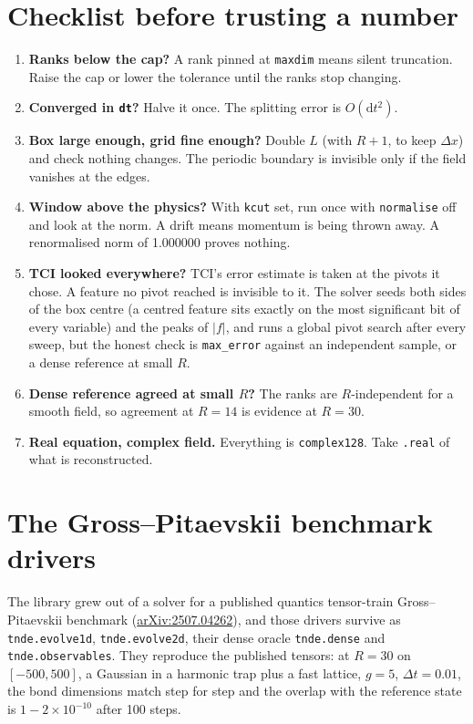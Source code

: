 \documentclass[11pt,a4paper]{article}
\newcommand{\code}[1]{\texttt{#1}}
\newcommand{\dd}{\mathrm{d}}
\begin{document}
\section{Checklist before trusting a number}
\label{sec:checklist}

\begin{enumerate}[leftmargin=1.5em]
\item \textbf{Ranks below the cap?} A rank pinned at \code{maxdim} means silent
  truncation. Raise the cap or lower the tolerance until the ranks stop changing.
\item \textbf{Converged in \code{dt}?} Halve it once. The splitting error is
  $O(\dd t^2)$.
\item \textbf{Box large enough, grid fine enough?} Double $L$ (with $R+1$, to keep
  $\Delta x$) and check nothing changes. The periodic boundary is invisible only if the
  field vanishes at the edges.
\item \textbf{Window above the physics?} With \code{kcut} set, run once with
  \code{normalise} off and look at the norm. A drift means momentum is being thrown
  away. A renormalised norm of 1.000000 proves nothing.
\item \textbf{TCI looked everywhere?} TCI's error estimate is taken at the pivots it
  chose. A feature no pivot reached is invisible to it. The solver seeds both sides of
  the box centre (a centred feature sits exactly on the most significant bit of every
  variable) and the peaks of $|f|$, and runs a global pivot search after every sweep,
  but the honest check is \code{max\_error} against an independent sample, or a dense
  reference at small $R$.
\item \textbf{Dense reference agreed at small $R$?} The ranks are $R$-independent for a
  smooth field, so agreement at $R=14$ is evidence at $R=30$.
\item \textbf{Real equation, complex field.} Everything is \code{complex128}. Take
  \code{.real} of what is reconstructed.
\end{enumerate}

\section{The Gross--Pitaevskii benchmark drivers}
\label{sec:legacy}

The library grew out of a solver for a published quantics tensor-train
Gross--Pitaevskii benchmark (\href{https://arxiv.org/abs/2507.04262}{arXiv:2507.04262}),
and those drivers survive as \code{tnde.evolve1d}, \code{tnde.evolve2d}, their dense
oracle \code{tnde.dense} and \code{tnde.observables}. They reproduce the published
tensors: at $R=30$ on $[-500,500]$, a Gaussian in a harmonic trap plus a fast lattice,
$g=5$, $\Delta t=0.01$, the bond dimensions match step for step and the overlap with
the reference state is $1-2\times10^{-10}$ after 100 steps.
\end{document}
